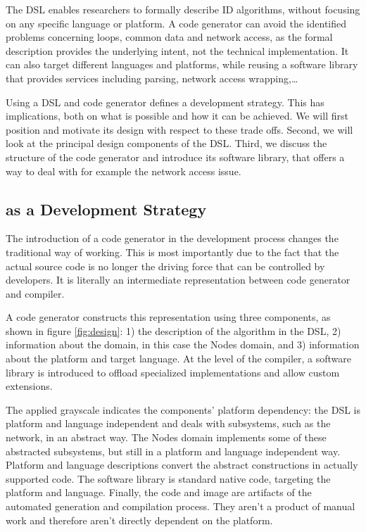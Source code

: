 \documentclass[3p,times,procedia]{elsarticle}
\begin{document}
The DSL enables researchers to formally describe ID algorithms, without
focusing on any specific language or platform. A code generator can avoid the
identified problems concerning loops, common data and network access, as the
formal description provides the underlying intent, not the technical
implementation. It can also target different languages and platforms, while
reusing a software library that provides services including parsing, network
access wrapping,\dots

Using a DSL and code generator defines a development strategy. This has
implications, both on what is possible and how it can be achieved. We will
first position \NAME and motivate its design with respect to these trade offs.
Second, we will look at the principal design components of the DSL. Third, we
discuss the structure of the code generator and introduce its software library,
that offers a way to deal with for example the network access issue.

\subsection{\NAME as a Development Strategy}
\label{positioning}

The introduction of a code generator in the development process changes the
traditional way of working. This is most importantly due to the fact that the
actual source code is no longer the driving force that can be controlled by
developers. It is literally an intermediate representation between code
generator and compiler.

A code generator constructs this representation using three components, as
shown in figure \ref{fig:design}: 1) the description of the algorithm in the
DSL, 2) information about the domain, in this case the Nodes domain, and 3)
information about the platform and target language. At the level of the
compiler, a software library is introduced to offload specialized
implementations and allow custom extensions.

The applied grayscale indicates the components' platform dependency: the DSL is
platform and language independent and deals with subsystems, such as the
network, in an abstract way. The Nodes domain implements some of these
abstracted subsystems, but still in a platform and language independent way.
Platform and language descriptions convert the abstract constructions in
actually supported code. The software library is standard native code,
targeting the platform and language. Finally, the code and image are artifacts
of the automated generation and compilation process. They aren't a product of
manual work and therefore aren't directly dependent on the platform.
\end{document}
